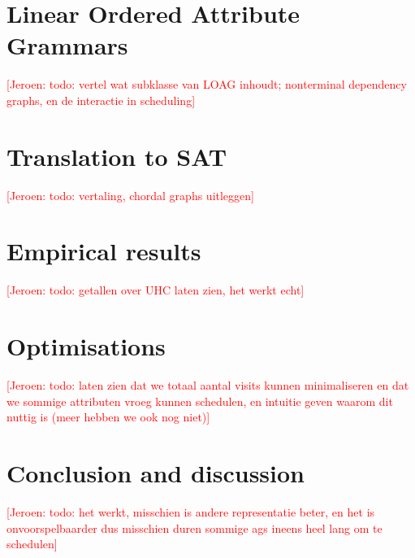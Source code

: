 \documentclass{llncs}
\newif\iffinal\finalfalse
\newcommand{\REM}[3]{\iffinal\else\textcolor{#2}{[#1: #3]}\fi}
\newcommand{\Jeroen}[1]{\REM{Jeroen}{red}{#1}}
\begin{document}
\section{Linear Ordered Attribute Grammars} \label{sect:loag}
\Jeroen{todo: vertel wat subklasse van LOAG inhoudt; nonterminal dependency graphs, en de interactie in scheduling}

\section{Translation to SAT} \label{sect:translation}
\Jeroen{todo: vertaling, chordal graphs uitleggen}

\section{Empirical results} \label{sect:results}
\Jeroen{todo: getallen over UHC laten zien, het werkt echt}

\section{Optimisations} \label{sect:optimisations}
\Jeroen{todo: laten zien dat we totaal aantal visits kunnen minimaliseren en dat we sommige attributen vroeg kunnen schedulen, en intuitie geven waarom dit nuttig is (meer hebben we ook nog niet)}

\section{Conclusion and discussion} \label{sect:conclusion}
\Jeroen{todo: het werkt, misschien is andere representatie beter, en het is onvoorspelbaarder dus misschien duren sommige ags ineens heel lang om te schedulen}





\end{document}
